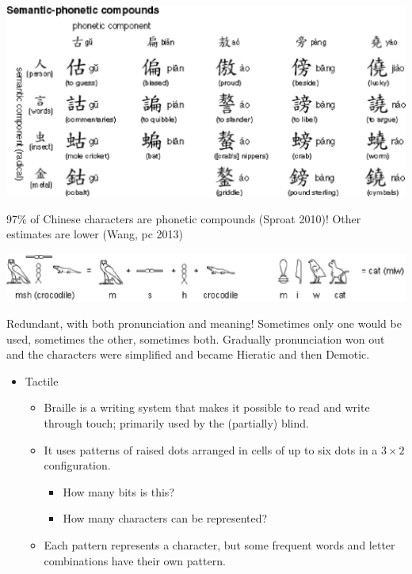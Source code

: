 \documentclass[a4paper,landscape,headrule,footrule,xetex]{foils}
\begin{document}

 \includegraphics{../pics/hanzi-4.eps}

97\% of Chinese characters are phonetic compounds (Sproat 2010)!  Other estimates are lower (Wang, pc 2013)





 \includegraphics{../pics/hiero.eps}

Redundant, with both pronunciation and meaning!  Sometimes only one
would be used, sometimes the other, sometimes both.  Gradually
pronunciation won out and the characters were simplified and became
Hieratic and then Demotic.



\begin{itemize}
\item Tactile
  \begin{itemize}
  \item Braille is a writing system that makes it possible to read and write through touch; primarily used by the (partially) blind.
  \item It uses patterns of raised dots arranged in cells of up to six dots in a $3 \times 2$ configuration.
    \begin{itemize}
    \item How many bits is this? %
    \item How many characters can be represented? %
    \end{itemize}
  \item Each pattern represents a character, but some frequent words and letter combinations have their own pattern.
  \end{itemize}
\end{itemize}
\end{document}
